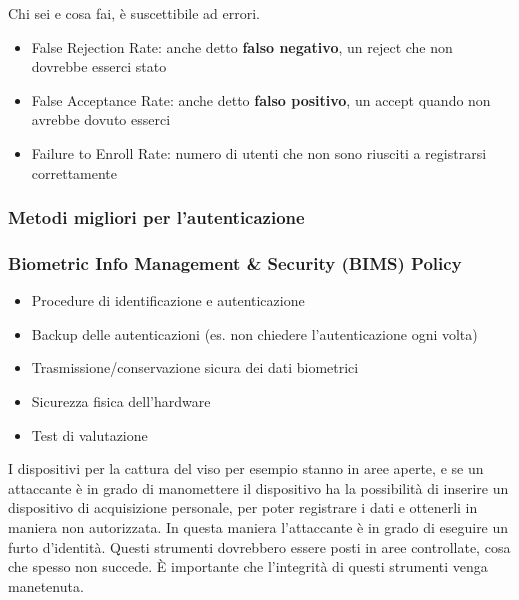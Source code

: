Chi sei e cosa fai, è suscettibile ad errori.

\begin{itemize}
\item False Rejection Rate: anche detto \textbf{falso negativo}, un reject che
non dovrebbe esserci stato
\item False Acceptance Rate: anche detto \textbf{falso positivo}, un accept
quando non avrebbe dovuto esserci
\item Failure to Enroll Rate: numero di utenti che non sono riusciti a
registrarsi correttamente
\end{itemize}

\subsubsection{Metodi migliori per l'autenticazione}


\subsubsection{Biometric Info Management \& Security (BIMS) Policy}

\begin{itemize}
 \item Procedure di identificazione e autenticazione
 \item Backup delle autenticazioni (es. non chiedere l'autenticazione ogni
 volta)
 \item Trasmissione/conservazione sicura dei dati biometrici
 \item Sicurezza fisica dell'hardware
 \item Test di valutazione
\end{itemize}

I dispositivi per la cattura del viso per esempio stanno in aree aperte, e se
un attaccante è in grado di manomettere il dispositivo ha la possibilità di
inserire un dispositivo di acquisizione personale, per poter registrare i dati
e ottenerli in maniera non autorizzata. In questa maniera l'attaccante è in
grado di eseguire un furto d'identità. Questi strumenti dovrebbero essere posti
in aree controllate, cosa che spesso non succede. È importante che l'integrità
di questi strumenti venga manetenuta.

